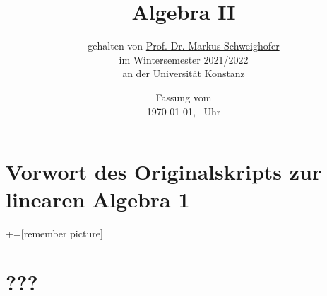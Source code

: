 \documentclass[
twoside=semi, %
fontsize=12,
DIV=12, %
cleardoublepage=current,
leqno,
headings=optiontoheadandtoc, %
toc=idx %
]{scrbook}
\theoremstyle{definition}
\DeclareMathOperator\im{im}
\begin{document}
\subject{Skript zur Vorlesung}
\title{Algebra II}
\subtitle{gehalten von \href{http://www.math.uni-konstanz.de/~schweigh/}{Prof. Dr. Markus Schweighofer}\\im Wintersemester 2021/2022\\an der Universität Konstanz}
\author{

}
\date{Fassung vom\\\today, \currenttime\ Uhr}
\frontmatter
\pagestyle{empty}

\maketitle

\noindent
    

\chapter*{Vorwort des Originalskripts zur linearen Algebra 1}
\pagestyle{scrheadings}
\manualmark
    

\tableofcontents

\mainmatter
{}+=[remember picture]

\chapter{???}
    

\backmatter
\printindex
\end{document}
